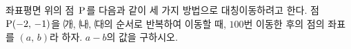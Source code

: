 좌표평면 위의 점~$\mathrm{P}$를 다음과 같이 세 가지 방법으로 대칭이동하려고 한다.  점~$\mathrm{P}(-2,\,-1)$을 ㈎, ㈏, ㈐의 순서로 반복하여 이동할 때, $100$번 이동한 후의 점의 좌표를 $(a,\,b)$라 하자. $a-b$의 값을 구하시오.
